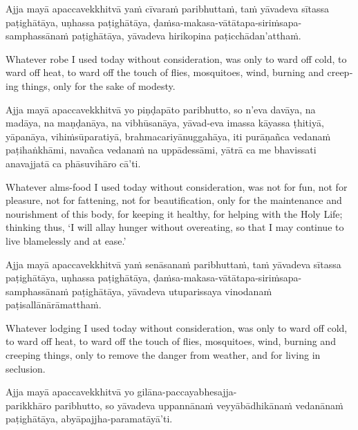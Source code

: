 \begin{leader}
\end{leader}


Ajja mayā apaccavekkhitvā yaṁ cīvaraṁ paribhuttaṁ, taṁ yāvadeva sītassa
paṭighātāya, uṇhassa paṭighātāya, ḍaṁsa-makasa-vātātapa-siriṁsapa-samphassānaṁ
paṭighātāya, yāvadeva hirikopina paṭicchādan'atthaṁ.

\begin{english}
  Whatever robe I used today without consideration, was only to ward off cold,
  to ward off heat, to ward off the touch of flies, mosquitoes, wind, burning
  and creeping things, only for the sake of modesty.
\end{english}

Ajja mayā apaccavekkhitvā yo piṇḍapāto paribhutto, so n'eva davāya, na madāya,
na maṇḍanāya, na vibhūsanāya, yāvad-eva imassa kāyassa ṭhitiyā, yāpanāya,
vihiṁsūparatiyā, brahmacariyānuggahāya, iti purāṇañca vedanaṁ paṭihaṅkhāmi,
navañca vedanaṁ na uppādessāmi, yātrā ca me bhavissati anavajjatā ca phāsuvihāro
cā'ti.

\begin{english}
  Whatever alms-food I used today without consideration, was not for fun, not
  for pleasure, not for fattening, not for beautification, only for the
  maintenance and nourishment of this body, for keeping it healthy, for helping
  with the Holy Life; thinking thus, `I will allay hunger without overeating, so
  that I may continue to live blamelessly and at ease.'
\end{english}

Ajja mayā apaccavekkhitvā yaṁ senāsanaṁ paribhuttaṁ, taṁ yāvadeva sītassa
paṭighātāya, uṇhassa paṭighātāya, ḍaṁsa-makasa-vātātapa-siriṁsapa-samphassānaṁ
paṭighātāya, yāvadeva utuparissaya vinodanaṁ paṭisallānārāmatthaṁ.

\begin{english}
  Whatever lodging I used today without consideration, was only to ward off
  cold, to ward off heat, to ward off the touch of flies, mosquitoes, wind,
  burning and creeping things, only to remove the danger from weather, and for
  living in seclusion.
\end{english}

Ajja mayā apaccavekkhitvā yo gilāna-paccayabhesajja-\\ parikkhāro paribhutto, so
yāvadeva uppannānaṁ veyyābādhikānaṁ vedanānaṁ paṭighātāya,
abyāpajjha-paramatāyā'ti.

